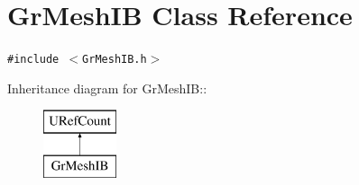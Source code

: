 \hypertarget{class_gr_mesh_i_b}{
\section{GrMeshIB Class Reference}
\label{class_gr_mesh_i_b}
}
{\tt \#include $<$GrMeshIB.h$>$}

Inheritance diagram for GrMeshIB::\begin{figure}[H]
\begin{center}
\leavevmode
\includegraphics[height=2cm]{class_gr_mesh_i_b}
\end{center}
\end{figure}
